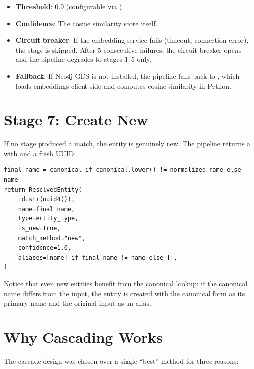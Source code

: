 \begin{itemize}
    \item \textbf{Threshold}: 0.9 (configurable via
          ).
    \item \textbf{Confidence}: The cosine similarity score itself.
    \item \textbf{Circuit breaker}: If the embedding service fails
          (timeout, connection error), the stage is skipped.  After 5
          consecutive failures, the circuit breaker opens and the
          pipeline degrades to stages 1--5 only.
    \item \textbf{Fallback}: If Neo4j GDS is not installed, the pipeline
          falls back to ,
          which loads embeddings client-side and computes cosine
          similarity in Python.
\end{itemize}


\section{Stage 7: Create New}
\label{sec:er-create-new}

If no stage produced a match, the entity is genuinely new.  The pipeline
returns a  with  and a fresh UUID.

\begin{lstlisting}[style=python, caption={New entity creation.}]
final_name = canonical if canonical.lower() != normalized_name else name
return ResolvedEntity(
    id=str(uuid4()),
    name=final_name,
    type=entity_type,
    is_new=True,
    match_method="new",
    confidence=1.0,
    aliases=[name] if final_name != name else [],
)
\end{lstlisting}

Notice that even new entities benefit from the canonical lookup: if the
canonical name differs from the input, the entity is created with the
canonical form as its primary name and the original input as an alias.


\section{Why Cascading Works}
\label{sec:er-why-cascading}

The cascade design was chosen over a single ``best'' method for three
reasons:

